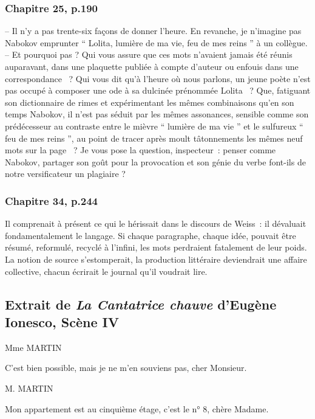 \documentclass{article}
\begin{document}
			\subsubsection{Chapitre 25, p.190}\label{ada_bibli_babel}
				-- Il	 n'y	 a	 pas	 trente-six	 façons	 de	 donner	 l'heure.	 En	 revanche,	 je
				n'imagine	pas	Nabokov	emprunter	``	Lolita,	lumière	de	ma	vie,	feu	de	mes
				reins	''	à	un	collègue.\\
				-- Et	pourquoi	pas	?	Qui	vous	assure	que	ces	mots	n'avaient	jamais	été
				réunis	 auparavant,	 dans	 une	 plaquette	 publiée	 à	 compte	 d'auteur	 ou enfouis	 dans	 une	 correspondance	~?	 Qui	 vous	 dit	 qu'à	 l'heure	 où	 nous
				parlons,	un	jeune	poète	n'est	pas	occupé	à	composer	une	ode	à	sa	dulcinée
				prénommée	 Lolita	~?	 Que,	 fatiguant	 son	 dictionnaire	 de	 rimes	 et
				expérimentant	les	mêmes	combinaisons	qu'en	son	temps	Nabokov,	il	n'est
				pas	séduit	par	les	mêmes	assonances,	sensible	comme	son	prédécesseur	au
				contraste	entre	le	mièvre	``	lumière	de	ma	vie	''	et	le	sulfureux	``	feu	de	mes
				reins	'',	au	point	de	tracer	après	moult	tâtonnements	les	mêmes	neuf	mots
				sur	 la	 page	~?	 Je	 vous	 pose	 la	 question,	 inspecteur~:	 penser	 comme
				Nabokov,	 partager	 son	 goût	 pour	 la	 provocation	 et	 son	 génie	 du	 verbe
				font-ils	de	notre	versificateur	un	plagiaire	?
			
			\subsubsection{Chapitre 34, p.244}\label{ada_valeur_langage}
				Il	comprenait	à	présent	ce	qui	le	hérissait	dans	le	discours	de	Weiss~:	il
				dévaluait	 fondamentalement	 le	 langage.	 Si	 chaque	 paragraphe,	 chaque
				idée,	pouvait	être	résumé,	reformulé,	recyclé	à	l'infini,	les	mots	perdraient
				fatalement	de	leur	poids.	La	notion	de	source	s'estomperait,	la	production
				littéraire	deviendrait	une	affaire	collective,	chacun	écrirait	le	journal	qu'il
				voudrait	lire.
				\newpage
		\subsection{Extrait de \textit{La Cantatrice chauve} d'Eugène Ionesco, Scène IV} \label{cantatrice}
			\begin{center}
				Mme MARTIN
			\end{center}
			C'est bien possible, mais je ne m'en souviens pas,
			cher Monsieur.
			
			\begin{center}
				M. MARTIN
			\end{center}
			Mon appartement est au cinquième étage, c'est le n° 8, chère Madame.
			
\end{document}
